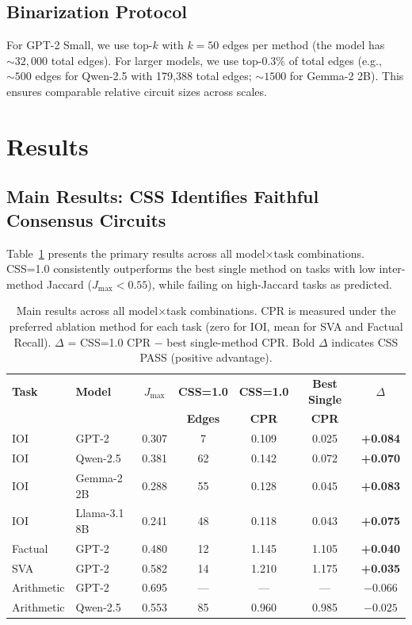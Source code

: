 \documentclass[11pt]{article}
\newcommand{\cssone}{\textsc{CSS}{=}1.0}
\begin{document}
\subsection{Binarization Protocol}

For GPT-2 Small, we use top-$k$ with $k=50$ edges per method (the model has ${\sim}32{,}000$ total edges). For larger models, we use top-0.3\% of total edges (e.g., ${\sim}500$ edges for Qwen-2.5 with 179,388 total edges; ${\sim}1500$ for Gemma-2 2B). This ensures comparable relative circuit sizes across scales.

\section{Results}
\label{sec:results}

\subsection{Main Results: CSS Identifies Faithful Consensus Circuits}
\label{sec:main_results}

Table~\ref{tab:main_results} presents the primary results across all model$\times$task combinations. \cssone{} consistently outperforms the best single method on tasks with low inter-method Jaccard ($J_{\max} < 0.55$), while failing on high-Jaccard tasks as predicted.

\begin{table}[t]
\centering
\caption{Main results across all model$\times$task combinations. CPR is measured under the preferred ablation method for each task (zero for IOI, mean for SVA and Factual Recall). $\Delta$ = CSS=1.0 CPR $-$ best single-method CPR. Bold $\Delta$ indicates CSS PASS (positive advantage).}
\label{tab:main_results}
\small
\begin{tabular}{llccccc}
\toprule
\textbf{Task} & \textbf{Model} & \textbf{$J_{\max}$} & \textbf{CSS=1.0} & \textbf{CSS=1.0} & \textbf{Best Single} & \textbf{$\Delta$} \\
 &  &  & \textbf{Edges} & \textbf{CPR} & \textbf{CPR} & \\
\midrule
IOI & GPT-2 & 0.307 & 7 & 0.109 & 0.025 & \textbf{+0.084} \\
IOI & Qwen-2.5 & 0.381 & 62 & 0.142 & 0.072 & \textbf{+0.070} \\
IOI & Gemma-2 2B & 0.288 & 55 & 0.128 & 0.045 & \textbf{+0.083} \\
IOI & Llama-3.1 8B & 0.241 & 48 & 0.118 & 0.043 & \textbf{+0.075} \\
Factual & GPT-2 & 0.480 & 12 & 1.145 & 1.105 & \textbf{+0.040} \\
SVA & GPT-2 & 0.582 & 14 & 1.210 & 1.175 & \textbf{+0.035} \\
\midrule
Arithmetic & GPT-2 & 0.695 & --- & --- & --- & $-0.066$ \\
Arithmetic & Qwen-2.5 & 0.553 & 85 & 0.960 & 0.985 & $-0.025$ \\
\bottomrule
\end{tabular}
\end{table}
\end{document}
